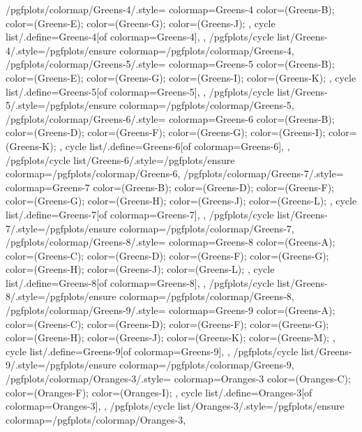 {  %
  /pgfplots/colormap/Greens-4/.style={
    colormap={Greens-4}{
      color=(Greens-B);
      color=(Greens-E);
      color=(Greens-G);
      color=(Greens-J);
    },
    cycle list/.define={Greens-4}{[of colormap=Greens-4]},
  },
  /pgfplots/cycle list/Greens-4/.style={/pgfplots/ensure colormap={/pgfplots/colormap/Greens-4}},
  /pgfplots/colormap/Greens-5/.style={
    colormap={Greens-5}{
      color=(Greens-B);
      color=(Greens-E);
      color=(Greens-G);
      color=(Greens-I);
      color=(Greens-K);
    },
    cycle list/.define={Greens-5}{[of colormap=Greens-5]},
  },
  /pgfplots/cycle list/Greens-5/.style={/pgfplots/ensure colormap={/pgfplots/colormap/Greens-5}},
  /pgfplots/colormap/Greens-6/.style={
    colormap={Greens-6}{
      color=(Greens-B);
      color=(Greens-D);
      color=(Greens-F);
      color=(Greens-G);
      color=(Greens-I);
      color=(Greens-K);
    },
    cycle list/.define={Greens-6}{[of colormap=Greens-6]},
  },
  /pgfplots/cycle list/Greens-6/.style={/pgfplots/ensure colormap={/pgfplots/colormap/Greens-6}},
  /pgfplots/colormap/Greens-7/.style={
    colormap={Greens-7}{
      color=(Greens-B);
      color=(Greens-D);
      color=(Greens-F);
      color=(Greens-G);
      color=(Greens-H);
      color=(Greens-J);
      color=(Greens-L);
    },
    cycle list/.define={Greens-7}{[of colormap=Greens-7]},
  },
  /pgfplots/cycle list/Greens-7/.style={/pgfplots/ensure colormap={/pgfplots/colormap/Greens-7}},
  /pgfplots/colormap/Greens-8/.style={
    colormap={Greens-8}{
      color=(Greens-A);
      color=(Greens-C);
      color=(Greens-D);
      color=(Greens-F);
      color=(Greens-G);
      color=(Greens-H);
      color=(Greens-J);
      color=(Greens-L);
    },
    cycle list/.define={Greens-8}{[of colormap=Greens-8]},
  },
  /pgfplots/cycle list/Greens-8/.style={/pgfplots/ensure colormap={/pgfplots/colormap/Greens-8}},
  /pgfplots/colormap/Greens-9/.style={
    colormap={Greens-9}{
      color=(Greens-A);
      color=(Greens-C);
      color=(Greens-D);
      color=(Greens-F);
      color=(Greens-G);
      color=(Greens-H);
      color=(Greens-J);
      color=(Greens-K);
      color=(Greens-M);
    },
    cycle list/.define={Greens-9}{[of colormap=Greens-9]},
  },
  /pgfplots/cycle list/Greens-9/.style={/pgfplots/ensure colormap={/pgfplots/colormap/Greens-9}},
  /pgfplots/colormap/Oranges-3/.style={
    colormap={Oranges-3}{
      color=(Oranges-C);
      color=(Oranges-F);
      color=(Oranges-I);
    },
    cycle list/.define={Oranges-3}{[of colormap=Oranges-3]},
  },
  /pgfplots/cycle list/Oranges-3/.style={/pgfplots/ensure colormap={/pgfplots/colormap/Oranges-3}},
}
